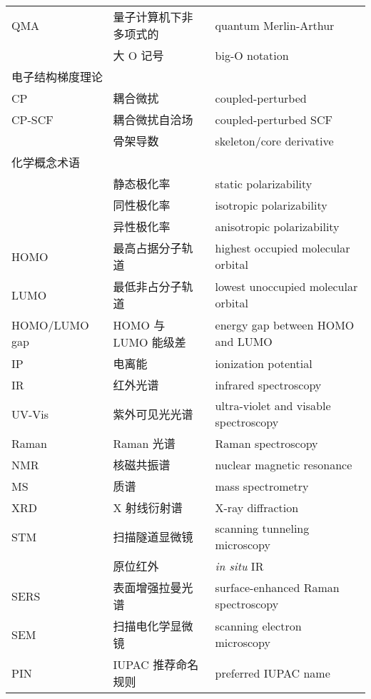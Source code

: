 \begin{longtable}{lll}
    QMA & 量子计算机下非多项式的 & quantum Merlin-Arthur \\
    & 大 O 记号 & big-O notation \\
    \midrule
    \multicolumn{3}{l}{\textsf{电子结构梯度理论}} \\
    CP & 耦合微扰 & coupled-perturbed \\
    CP-SCF & 耦合微扰自洽场 & coupled-perturbed SCF \\
    & 骨架导数 & skeleton/core derivative \\
    \midrule
    \multicolumn{3}{l}{\textsf{化学概念术语}} \\
    & 静态极化率 & static polarizability \\
    & 同性极化率 & isotropic polarizability \\
    & 异性极化率 & anisotropic polarizability \\
    HOMO & 最高占据分子轨道 & highest occupied molecular orbital \\
    LUMO & 最低非占分子轨道 & lowest unoccupied molecular orbital \\
    HOMO/LUMO gap & HOMO 与 LUMO 能级差 & energy gap between HOMO and LUMO \\
    IP & 电离能 & ionization potential \\
    IR & 红外光谱 & infrared spectroscopy \\
    UV-Vis & 紫外可见光光谱 & ultra-violet and visable spectroscopy \\
    Raman & Raman 光谱 & Raman spectroscopy \\
    NMR & 核磁共振谱 & nuclear magnetic resonance \\
    MS & 质谱 & mass spectrometry \\
    XRD & X 射线衍射谱 & X-ray diffraction \\
    STM & 扫描隧道显微镜 & scanning tunneling microscopy \\
    & 原位红外 & \emph{in situ} IR \\
    SERS & 表面增强拉曼光谱 & surface-enhanced Raman spectroscopy \\
    SEM & 扫描电化学显微镜 & scanning electron microscopy \\
    PIN & IUPAC 推荐命名规则 & preferred IUPAC name \\
\end{longtable}

\endgroup
